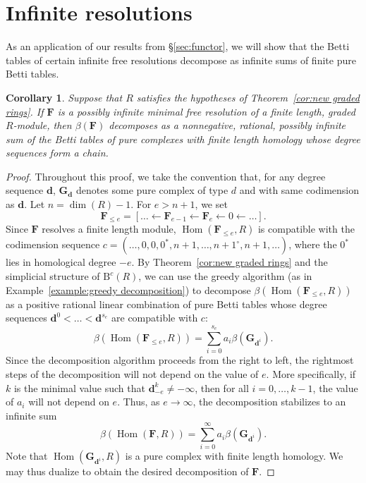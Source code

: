 \documentclass[12pt]{amsart}
\newtheorem{cor}[lemma]{Corollary}
\theoremstyle{definition}
\theoremstyle{remark}
\newcommand{\Hom}{\operatorname{Hom}} %
\newcommand{\cc}{c}
\newcommand{\dd}{\mathbf{d}}
\newcommand{\FF}{\mathbf{F}}
\newcommand{\zp}{\circ}
\newcommand{\BBQ}{\mathrm{B}}
\begin{document}
\section{Infinite resolutions}\label{sec:infinite}
As an application of our results from \S\ref{sec:functor}, we will show that the Betti tables of certain infinite free resolutions decompose as infinite sums of finite pure Betti tables.

\begin{cor}\label{cor:decomp infinite}
Suppose that $R$ satisfies the hypotheses of Theorem~\ref{cor:new graded rings}. If $\FF$ is a possibly infinite minimal free resolution of a finite length, graded $R$-module, then $\beta(\FF)$ decomposes as a nonnegative, rational, possibly infinite sum of the Betti tables of pure complexes with finite length homology whose degree sequences form a chain.
\end{cor}
\begin{proof}
Throughout this proof, we take the convention that, for any degree sequence $\dd$, $\mathbf{G}_{\dd}$ denotes some pure complex of type $d$ and with same codimension as $\dd$.  Let $n=\dim(R)-1$.  For $e> n+1$, we set
\[
\FF_{\leq e}=[\dots \gets \FF_{e-1}\gets \FF_e \gets 0 \gets \dots].
\]
Since $\FF$ resolves a finite length module, $\Hom(\FF_{\leq e},R)$ is compatible with the codimension sequence $\cc=(\dots,0,0,0^*,n+1,\dots, n+1^\zp, n+1,\dots)$, where the $0^*$ lies in homological degree $-e$.  By Theorem~\ref{cor:new graded rings} and the simplicial structure of
$\BBQ^{\cc}(R)$, we can use the greedy algorithm (as in Example~\ref{example:greedy decomposition}) to decompose 
$\beta(\Hom(\FF_{\leq e},R))$ as a positive rational linear combination of pure Betti tables whose degree sequences $\dd^0<\dots <\dd^{s_e}$ are compatible with $\cc$:
\[
\beta(\Hom(\FF_{\leq e},R))=\sum_{i=0}^{s_e} a_{i}\beta(\mathbf{G}_{\dd^i}).
\]
Since the decomposition algorithm proceeds from the right to left, the rightmost steps of the decomposition will not depend on the value of $e$.  More specifically, if
$k$ is the minimal value such that $\dd^k_{-e}\ne -\infty$, then for all $i=0, \dots, k-1$, the value of $a_i$ will not depend on $e$.   Thus, as $e\to \infty$, the decomposition stabilizes to an infinite sum
\[
\beta(\Hom(\FF,R))=\sum_{i=0}^\infty a_i\beta(\mathbf{G}_{\dd^i}).
\]
Note that $\Hom(\mathbf{G}_{\dd^i},R)$ is a pure complex with finite length homology.  We may thus dualize to obtain the desired decomposition of $\FF$.
\end{proof}
\end{document}
